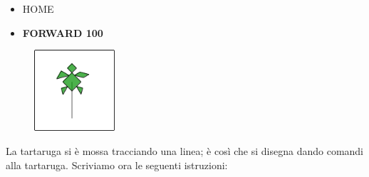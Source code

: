 \begin{scriptsize}
\begin{minipage}{0.45\textwidth}
\begin{itemize}[itemsep=-3pt,parsep=2pt]
\item[] \hspace{0.5cm} HOME 
\item[] \hspace{0.5cm} \textbf{FORWARD 100}
\end{itemize}
\end{minipage}
\end{scriptsize}
\begin{minipage}{0.5\textwidth}
\begin{figure}[H]
   \includegraphics[width=3.0cm,trim=4 4 8 4,clip]{./images/disegnare/disegnare-2.png}
   \label{dis-2}
\end{figure}
\end{minipage} \hfill

\vskip 1cm

La tartaruga si è mossa tracciando una linea; è così che si disegna dando comandi alla tartaruga.
Scriviamo ora le seguenti istruzioni:

\vskip 1cm

